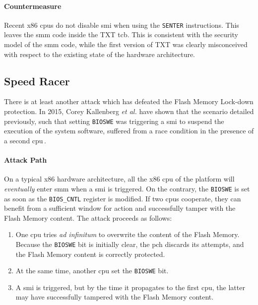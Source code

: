 \paragraph{Countermeasure}
%
Recent x86 \acp{cpu} do not disable \ac{smi} when using the \texttt{SENTER}
instructions.
%
This leaves the \ac{smm} code inside the TXT \ac{tcb}.
%
This is consistent with the security model of the \ac{smm} code, while the first
version of TXT was clearly misconceived with respect to the existing state of
the hardware architecture.

\subsection{Speed Racer}
\label{subsec:usecase:hse:speed}

There is at least another attack which has defeated the Flash Memory Lock-down
protection.
%
In 2015, Corey Kallenberg \emph{et al.} have shown that the scenario detailed
previously, such that setting \texttt{BIOSWE} was triggering a \ac{smi} to suspend
the execution of the system software, suffered from a race condition in the presence
of a second \ac{cpu}\,\cite{kallenberg2015racecondition}.

\paragraph{Attack Path}
%
On a typical x86 hardware architecture, all the x86 \ac{cpu} of the platform
will \emph{eventually} enter \ac{smm} when a \ac{smi} is triggered.
%
On the contrary, the \texttt{BIOSWE} is set as soon as the \texttt{BIOS\_CNTL}
register is modified.
%
If two \acp{cpu} cooperate, they can benefit from a sufficient window for action
and successfully tamper with the Flash Memory content.
%
The attack proceeds as follows:

\begin{enumerate}
\item One \ac{cpu} tries \emph{ad infinitum} to overwrite the content of the
  Flash Memory. Because the \texttt{BIOSWE} bit is initially clear, the \ac{pch}
  discards its attempts, and the Flash Memory content is correctly protected.
%
\item At the same time, another \ac{cpu} set the \texttt{BIOSWE} bit.
%
\item A \ac{smi} is triggered, but by the time it propagates to the first
  \ac{cpu}, the latter may have successfully tampered with the Flash Memory
  content.
%
\end{enumerate}

